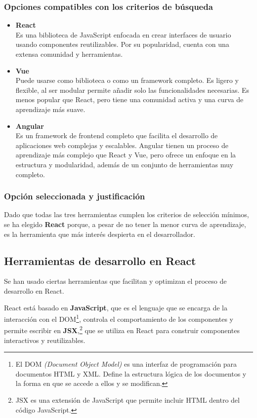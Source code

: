 \subsubsection{Opciones compatibles con los criterios de búsqueda}
\begin{itemize}
    \item \textbf{React}\\
        Es una biblioteca de JavaScript enfocada en crear interfaces de usuario usando componentes reutilizables. Por su popularidad, cuenta con una extensa comunidad y herramientas.
    \item \textbf{Vue}\\
        Puede usarse como biblioteca o como un framework completo. Es ligero y flexible, al ser modular permite añadir solo las funcionalidades necesarias. Es menos popular que React, pero tiene una comunidad activa y una curva de aprendizaje más suave.
    \item \textbf{Angular}\\
        Es un framework de frontend completo que facilita el desarrollo de aplicaciones web complejas y escalables. Angular tienen un proceso de aprendizaje más complejo que React y Vue, pero ofrece un enfoque en la estructura y modularidad, además de un conjunto de herramientas muy completo.
\end{itemize}

\subsubsection{Opción seleccionada y justificación}
Dado que todas las tres herramientas cumplen los criterios de selección mínimos, se ha elegido \textbf{React} porque, a pesar de no tener la menor curva de aprendizaje, es la herramienta que más interés despierta en el desarrollador.

\subsection{Herramientas de desarrollo en React}
Se han usado ciertas herramientas que facilitan y optimizan el proceso de desarrollo en React.

React está basado en \textbf{JavaScript}, que es el lenguaje que se encarga de la interacción con el DOM\footnote{ El DOM \textit{(Document Object Model)} es una interfaz de programación para documentos HTML y XML. Define la estructura lógica de los documentos y la forma en que se accede a ellos y se modifican.}, controla el comportamiento de los componentes y permite escribir en \textbf{JSX},\footnote{JSX es una extensión de JavaScript que permite incluir HTML dentro del código JavaScript.} que se utiliza en React para construir componentes interactivos y reutilizables.

